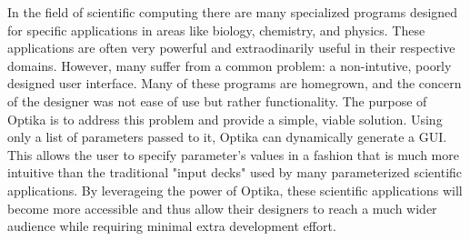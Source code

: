 In the field of scientific computing there are many specialized programs designed for specific applications 
in areas like biology, chemistry, and physics. These applications are often very powerful and extraodinarily 
useful in their respective domains. However, many suffer from a common problem: a non-intutive, poorly designed user interface. Many 
of these programs are homegrown, and the concern of the designer was not ease of use but rather 
functionality. The purpose of Optika is to address this problem and provide a simple, viable solution. Using
only a list of parameters passed to it, Optika can dynamically generate a GUI. This allows the user to specify 
parameter's values in a fashion that is much more intuitive than the traditional "input decks" used by many 
parameterized scientific applications. By leverageing the power of Optika, these scientific applications 
will become more accessible and thus allow their designers to reach a much wider audience while requiring 
minimal extra development effort.
